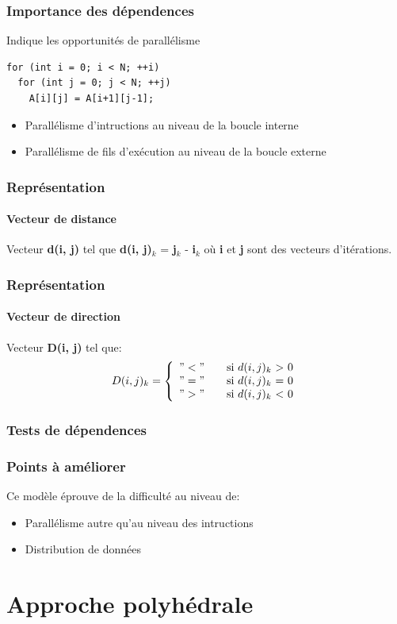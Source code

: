 \documentclass{beamer}
\begin{document}
\begin{frame}[fragile]
\frametitle{Importance des dépendences}
Indique les opportunités de parallélisme \\
\begin{lstlisting}
for (int i = 0; i < N; ++i)
  for (int j = 0; j < N; ++j)
    A[i][j] = A[i+1][j-1];

\end{lstlisting}
\begin{itemize}
\item Parallélisme d'intructions au niveau de la boucle interne
\item Parallélisme de fils d'exécution au niveau de la boucle externe
\end{itemize}
\end{frame}

\begin{frame}
\frametitle{Représentation}
\framesubtitle{Vecteur de distance}
Vecteur \textbf{d(i, j)} tel que \textbf{d(i, j)$_{k}$} = \textbf{j}$_{k}$ - \textbf{i}$_{k}$ où \textbf{i} et \textbf{j} sont des vecteurs d'itérations.
\end{frame}

\begin{frame}
\frametitle{Représentation}
\framesubtitle{Vecteur de direction}
Vecteur \textbf{D(i, j)} tel que: 
\[ D(i, j)_{k} = \left\{
  \begin{array}{l l}
    "<" & \quad \text{si $d(i, j)_{k}$ > 0}\\
    "=" & \quad \text{si $d(i, j)_{k}$ = 0}\\
    ">" & \quad \text{si $d(i, j)_{k}$ < 0}
  \end{array} \right.\]
\end{frame}

\begin{frame}
\frametitle{Tests de dépendences}

\end{frame}

\begin{frame}
\frametitle{Points à améliorer}
Ce modèle éprouve de la difficulté au niveau de:
\begin{itemize}
\item Parallélisme autre qu'au niveau des intructions 
\item Distribution de données
\end{itemize}
\end{frame}

\section{Approche polyhédrale}
\end{document}

